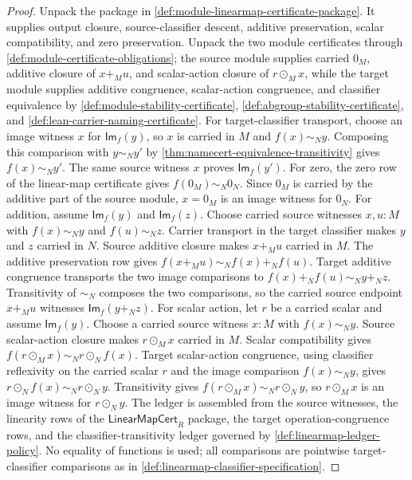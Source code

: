 \begin{proof}
Unpack the package in \autoref{def:module-linearmap-certificate-package}. It supplies output closure, source-classifier descent, additive preservation, scalar compatibility, and zero preservation. Unpack the two module certificates through \autoref{def:module-certificate-obligations}; the source module supplies carried $0_M$, additive closure of $x+_M u$, and scalar-action closure of $r\odot_M x$, while the target module supplies additive congruence, scalar-action congruence, and classifier equivalence by \autoref{def:module-stability-certificate}, \autoref{def:abgroup-stability-certificate}, and \autoref{def:lean-carrier-naming-certificate}. For target-classifier transport, choose an image witness $x$ for $\mathsf{Im}_f(y)$, so $x$ is carried in $M$ and $f(x)\sim_N y$. Composing this comparison with $y\sim_N y'$ by \autoref{thm:namecert-equivalence-transitivity} gives $f(x)\sim_N y'$. The same source witness $x$ proves $\mathsf{Im}_f(y')$. For zero, the zero row of the linear-map certificate gives $f(0_M)\sim_N0_N$. Since $0_M$ is carried by the additive part of the source module, $x=0_M$ is an image witness for $0_N$. For addition, assume $\mathsf{Im}_f(y)$ and $\mathsf{Im}_f(z)$. Choose carried source witnesses $x,u:M$ with $f(x)\sim_N y$ and $f(u)\sim_N z$. Carrier transport in the target classifier makes $y$ and $z$ carried in $N$. Source additive closure makes $x+_M u$ carried in $M$. The additive preservation row gives $f(x+_M u)\sim_N f(x)+_N f(u)$. Target additive congruence transports the two image comparisons to $f(x)+_N f(u)\sim_N y+_N z$. Transitivity of $\sim_N$ composes the two comparisons, so the carried source endpoint $x+_M u$ witnesses $\mathsf{Im}_f(y+_N z)$. For scalar action, let $r$ be a carried scalar and assume $\mathsf{Im}_f(y)$. Choose a carried source witness $x:M$ with $f(x)\sim_N y$. Source scalar-action closure makes $r\odot_M x$ carried in $M$. Scalar compatibility gives $f(r\odot_M x)\sim_N r\odot_N f(x)$. Target scalar-action congruence, using classifier reflexivity on the carried scalar $r$ and the image comparison $f(x)\sim_N y$, gives $r\odot_N f(x)\sim_N r\odot_N y$. Transitivity gives $f(r\odot_M x)\sim_N r\odot_N y$, so $r\odot_M x$ is an image witness for $r\odot_N y$. The ledger is assembled from the source witnesses, the linearity rows of the $\mathsf{LinearMapCert}_R$ package, the target operation-congruence rows, and the classifier-transitivity ledger governed by \autoref{def:linearmap-ledger-policy}. No equality of functions is used; all comparisons are pointwise target-classifier comparisons as in \autoref{def:linearmap-classifier-specification}.
\end{proof}

